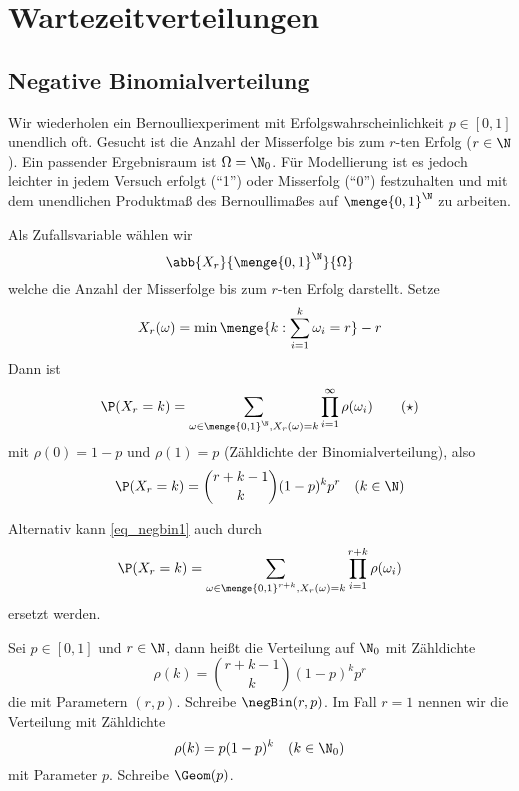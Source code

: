 \section{Wartezeitverteilungen}

\subsection{Negative Binomialverteilung}

Wir wiederholen ein Bernoulliexperiment mit Erfolgswahrscheinlichkeit $p \in [0,1]$ unendlich oft. Gesucht ist die Anzahl der Misserfolge bis zum $r$-ten Erfolg ($r \in \N$). Ein passender Ergebnisraum ist $\Omega = \N_0$. Für Modellierung ist es jedoch leichter in jedem Versuch erfolgt (``1'') oder Misserfolg (``0'') festzuhalten und mit dem unendlichen Produktmaß des Bernoullimaßes auf $\menge{0,1}^{\N}$ zu arbeiten. 

Als Zufallsvariable wählen wir
\begin{equation*}
	\abb{X_r}{\menge{0,1}^\N}{\Omega}
\end{equation*}
welche die Anzahl der Misserfolge bis zum $r$-ten Erfolg darstellt. Setze
\begin{equation*}
	X_r(\omega) = \min\menge{k : \sum_{i=1}^{k} \omega_i = r} - r
\end{equation*}
Dann ist
\begin{equation}
	\P(X_r = k) = \sum_{\omega \in \menge{0,1}^\N, X_r(\omega) = k} \prod_{i=1}^{\infty} \rho(\omega_i) \tag{$\star$} \label{eq_negbin1}
\end{equation}
mit $\rho(0) = 1-p$ und $\rho(1) = p$ (Zähldichte der Binomialverteilung), also
\begin{equation*}
	\P(X_r = k) = \binom{r+k-1}{k} (1-p)^k p^r \quad (k \in \N)
\end{equation*}

\begin{*anmerkung}
	Alternativ kann \cref{eq_negbin1} auch durch
	\begin{equation*}
		\P(X_r = k) = \sum_{\omega \in \menge{0,1}^{r+k}, X_r(\omega) = k} \prod_{i=1}^{r+k} \rho(\omega_i)
	\end{equation*}
	ersetzt werden.
\end{*anmerkung}

\begin{definition}
	\label{4_1_defintion}
	Sei $p \in[0,1]$ und $r \in \N$, dann heißt die Verteilung auf $\N_0$ mit Zähldichte
	\begin{equation*}
		\rho(k) = \binom{r+k-1}{k} (1-p)^k p^r 
	\end{equation*}
	die  mit Parametern $(r,p)$. Schreibe $\negBin(r,p)$. Im Fall $r = 1$ nennen wir die Verteilung mit Zähldichte
	\begin{equation*}
		\rho(k) = p (1-p)^k \quad (k \in \N_0)
	\end{equation*}
	 mit Parameter $p$. Schreibe $\Geom(p)$.
\end{definition}


